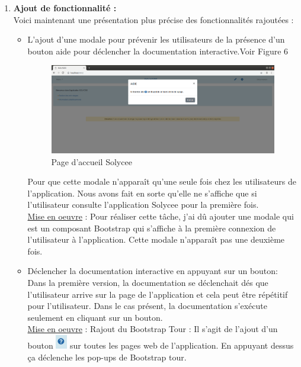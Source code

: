 \documentclass[12pt]{article}
\begin{document}
\begin{enumerate}
\item \textbf{Ajout de fonctionnalité :}\\
Voici maintenant une présentation plus précise des fonctionnalités rajoutées : 

\begin{itemize}
\item  L'ajout d'une modale pour prévenir les utilisateurs de la présence d'un bouton aide pour déclencher la documentation interactive.Voir Figure 6

\begin{figure}[H]
	\centering
 		\includegraphics[width=1\textwidth]{diagrammes/aide_modal.png}
  		\caption{Page d'accueil Solycee}
	\end{figure}
Pour que cette modale n'apparaît qu'une seule fois chez les utilisateurs de l'application. Nous avons fait en sorte qu'elle ne s'affiche que si l'utilisateur consulte l'application Solycee pour la première fois. \\ 


\underline{Mise en oeuvre} :
Pour réaliser cette tâche, j'ai dû ajouter une modale qui est un composant Bootstrap qui s'affiche à la première connexion de l'utilisateur à l'application. Cette modale n'apparaît pas une deuxième fois. \\ 

   
\item  Déclencher la documentation interactive en appuyant sur un bouton: Dans la première version, la documentation se déclenchait dés que l'utilisateur arrive sur la page de l'application et cela peut être répétitif pour l'utilisateur. Dans le cas présent, la documentation s'exécute seulement en cliquant sur un bouton. \\ 

\underline{Mise en oeuvre} :
Rajout du Bootstrap Tour : Il s'agit de l'ajout d'un bouton \includegraphics[width=5mm,scale=0.5]{diagrammes/Bouton_aideDispo.png} sur toutes les pages web de l'application. En appuyant dessus ça déclenche les pop-ups  de Bootstrap tour. 



\end{itemize}
\end{enumerate}
\end{document}
